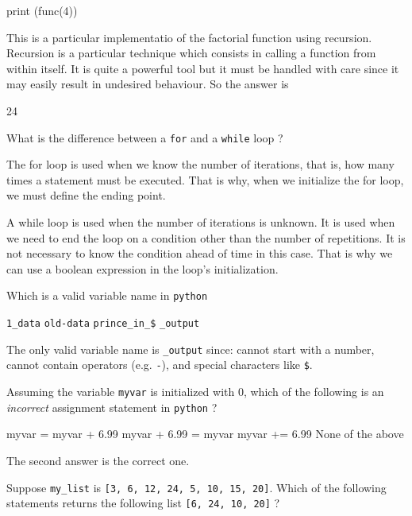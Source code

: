 \documentclass[12pt,a4paper]{exam}
\begin{document}
\begin{questions}
\begin{ipython}
print (func(4))
\end{ipython}
\fillwithlines{3cm}
\begin{solution}
This is a particular implementatio of the factorial function using recursion. Recursion is a particular technique which consists in
calling a function from within itself. It is quite a powerful tool but it must be handled with care since it may easily result in
undesired behaviour. So the answer is
\begin{ioutput}
24
\end{ioutput}
\end{solution}

\question
What is the difference between a \texttt{for} and a \texttt{while} loop ?
\fillwithlines{3cm}
\begin{solution}
The for loop is used when we know the number of iterations, that is, how many times a statement must be executed. That is why, when we initialize the for loop, we must define the ending point.

A while loop is used when the number of iterations is unknown. It is used when we need to end the loop on a condition other than the number of repetitions. It is not necessary to know the condition ahead of time in this case. That is why we can use a boolean expression in the loop's initialization.
\end{solution}
\question
Which is a valid variable name in \texttt{python} 

\begin{checkboxes}
\choice \texttt{1\_data}
\choice \texttt{old-data}
\choice \texttt{prince\_in\_\$}
\choice \texttt{\_output}
\end{checkboxes}
\begin{solution}
The only valid variable name is \texttt{\_output} since: cannot start with a number, cannot contain operators (e.g. \texttt{-}), and special characters like \texttt{\$}.
\end{solution}
\question
Assuming the variable \texttt{myvar} is initialized with 0, which of the following is an \emph{incorrect} assignment statement
in \texttt{python} ?

\begin{checkboxes}
\choice myvar = myvar + 6.99
\choice myvar + 6.99 = myvar
\choice myvar += 6.99
\choice None of the above
\end{checkboxes}
\begin{solution}
The second answer is the correct one.
\end{solution}
\question
Suppose \texttt{my\_list} is \texttt{[3, 6, 12, 24, 5, 10, 15, 20]}.
Which of the following statements returns the following list \texttt{[6, 24, 10, 20]} ?


\end{questions}
\end{document}
